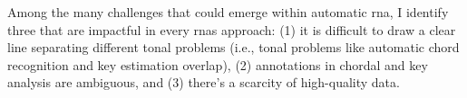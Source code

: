 

Among the many challenges that could emerge within automatic
\gls{rna}, I identify three that are impactful
in every \glspl{rna} approach: (1) it is difficult to draw a clear line separating
different tonal problems (i.e., tonal problems like automatic chord recognition and key estimation overlap), (2)
annotations in chordal and key analysis are ambiguous, and (3) there's a scarcity of high-quality data.
